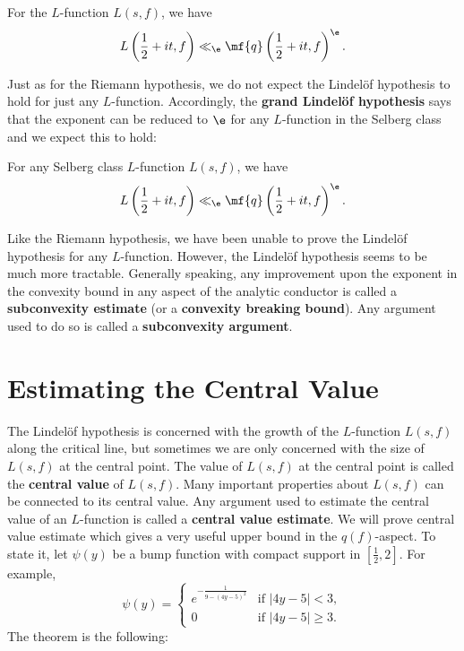     \begin{conjecture}
      For the $L$-function $L(s,f)$, we have
      \[
        L\left(\frac{1}{2}+it,f\right) \ll_{\e} \mf{q}\left(\frac{1}{2}+it,f\right)^{\e}.
      \]
    \end{conjecture}

    Just as for the Riemann hypothesis, we do not expect the Lindel\"of hypothesis to hold for just any $L$-function. Accordingly, the \textbf{grand Lindel\"of hypothesis} says that the exponent can be reduced to $\e$ for any $L$-function in the Selberg class and we expect this to hold:

    \begin{conjecture}
      For any Selberg class $L$-function $L(s,f)$, we have
      \[
        L\left(\frac{1}{2}+it,f\right) \ll_{\e} \mf{q}\left(\frac{1}{2}+it,f\right)^{\e}.
      \]
    \end{conjecture}

    Like the Riemann hypothesis, we have been unable to prove the Lindel\"of hypothesis for any $L$-function. However, the Lindel\"of hypothesis seems to be much more tractable. Generally speaking, any improvement upon the exponent in the convexity bound in any aspect of the analytic conductor is called a \textbf{subconvexity estimate} (or a \textbf{convexity breaking bound}). Any argument used to do so is called a \textbf{subconvexity argument}.
  \section{Estimating the Central Value}
    The Lindel\"of hypothesis is concerned with the growth of the $L$-function $L(s,f)$ along the critical line, but sometimes we are only concerned with the size of $L(s,f)$ at the central point. The value of $L(s,f)$ at the central point is called the \textbf{central value} of $L(s,f)$. Many important properties about $L(s,f)$ can be connected to its central value. Any argument used to estimate the central value of an $L$-function is called a \textbf{central value estimate}. We will prove central value estimate which gives a very useful upper bound in the $q(f)$-aspect. To state it, let $\psi(y)$ be a bump function with compact support in $\left[\frac{1}{2},2\right]$. For example,
    \[
      \psi(y) = \begin{cases} e^{-\frac{1}{9-(4y-5)^{2}}} & \text{if $|4y-5| < 3$}, \\ 0 & \text{if $|4y-5| \ge 3$}. \end{cases}
    \]
    The theorem is the following:

